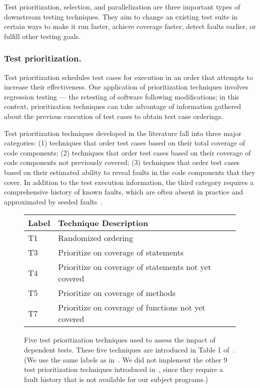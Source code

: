 Test prioritization, selection, and parallelization are three
important types of downstream testing techniques. They aim to
change an existing test suite in certain ways to make it run
faster, achieve coverage faster, detect faults earlier,
or fulfill other testing goals.

\subsubsection{Test prioritization.}

Test prioritization schedules test cases
for execution in an order that attempts to
increase their effectiveness.
One application of prioritization techniques involves
regression testing --- the retesting of software following modifications;
in this context, prioritization techniques can take advantage of information gathered about the previous
execution of test cases to obtain test case orderings.

Test prioritization techniques developed in the literature
fall into three major categories: (1) techniques
that order test cases based on their total coverage of
code components; (2) techniques that order test
cases based on their coverage of code components
not previously covered; (3) techniques that order test
cases based on their estimated ability to reveal faults
in the code components that they cover. In addition to the
test execution information, the third
category requires a comprehensive history of known
faults, which are often absent in practice and
approximated by seeded faults~\cite{}.


\begin{figure}
\centering
\setlength{\tabcolsep}{0.25\tabcolsep}
\begin{tabular}{|l|l|}
\hline
\textbf{Label} & \textbf{Technique Description} \\
\hline
T1 & Randomized ordering \\
T3 & Prioritize on coverage of statements \\
T4 & Prioritize on coverage of statements not yet covered\\
T5 & Prioritize on coverage of methods\\
T7 & Prioritize on coverage of functions not yet covered \\
\hline
\end{tabular}
\caption{Five test prioritization techniques used
to assess the impact of dependent tests. These five
techniques are introduced in Table 1
of~\cite{Elbaum:2000:PTC:347324.348910}. (We use
the same labels as in~\cite{Elbaum:2000:PTC:347324.348910}. We did not
implement the other 9 test prioritization techniques
introduced in~\cite{Elbaum:2000:PTC:347324.348910}, since
they require a fault history that is not
available for our subject programs.)
}
\label{tab:testprio}
\end{figure}




